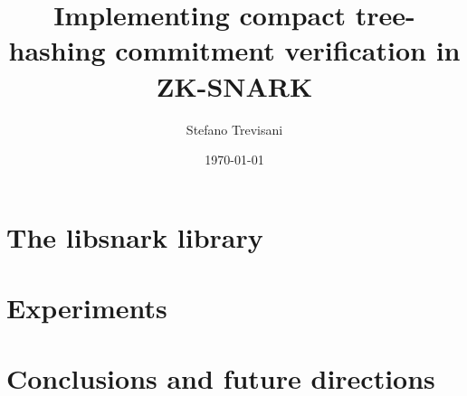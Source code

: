 \documentclass{article}
\author{Stefano Trevisani}
\date{\today}
\title{Implementing compact tree-hashing commitment verification in ZK-SNARK}
\theoremstyle{definition}
\theoremstyle{theorem}
\theoremstyle{example}
\begin{document}
\maketitle
\clearpage
\tableofcontents




\section{The libsnark library}\label{sec:libsnark}

\section{Experiments}\label{sec:experiments}

\section{Conclusions and future directions}\label{sec:conclusions}
\end{document}
